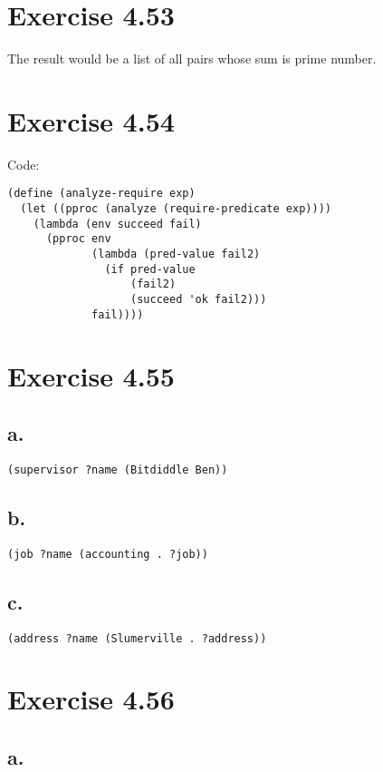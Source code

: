 \documentclass[../main.tex]{subfiles}
\begin{document}
\section{Exercise 4.53}

The result would be a list of all pairs whose sum is prime number.

\section{Exercise 4.54}

Code:

\begin{lstlisting}
(define (analyze-require exp)
  (let ((pproc (analyze (require-predicate exp))))
    (lambda (env succeed fail)
      (pproc env
             (lambda (pred-value fail2)
               (if pred-value
                   (fail2)
                   (succeed 'ok fail2)))
             fail))))
\end{lstlisting}

\section{Exercise 4.55}

\subsection{a.}

\lstinline{(supervisor ?name (Bitdiddle Ben))}

\subsection{b.}

\lstinline{(job ?name (accounting . ?job))}

\subsection{c.}

\lstinline{(address ?name (Slumerville . ?address))}


\section{Exercise 4.56}

\subsection{a.}
\end{document}
